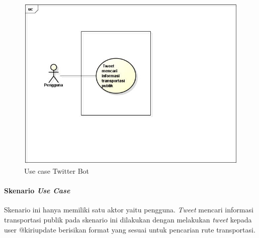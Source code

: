 \begin{figure}[htbp]
	\centering
		\includegraphics{Gambar/usecase.jpg}
	\caption{Use case Twitter Bot}
	\label{fig:usecase}
\end{figure}

\paragraph{Skenario \textit{Use Case}}
Skenario ini hanya memiliki satu aktor yaitu pengguna. \textit{Tweet} mencari informasi transportasi publik pada skenario ini dilakukan dengan melakukan \textit{tweet} kepada user @kiriupdate berisikan format yang sesuai untuk pencarian rute transportasi. 

